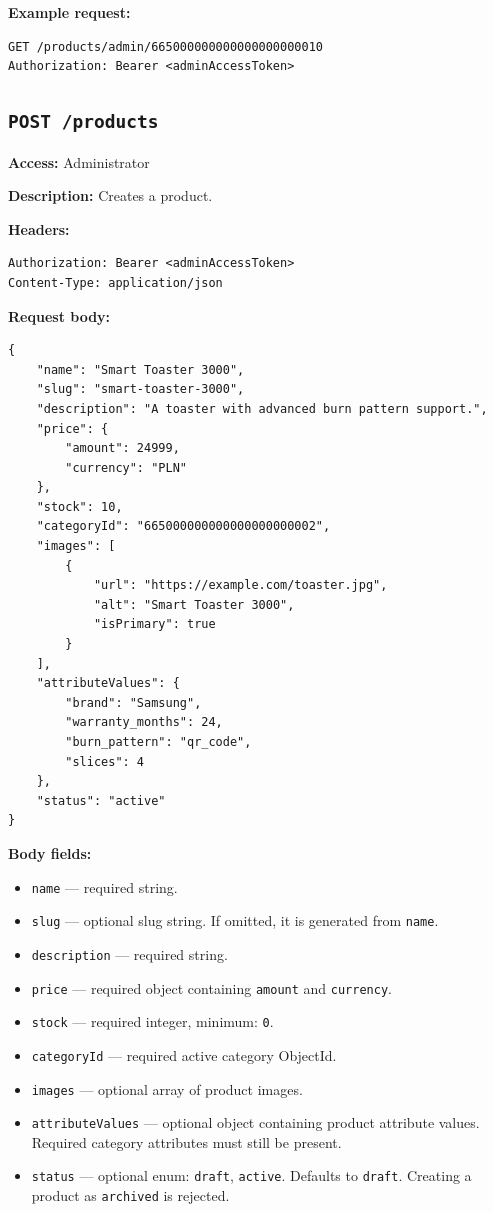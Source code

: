 \textbf{Example request:}

\begin{verbatim}
GET /products/admin/665000000000000000000010
Authorization: Bearer <adminAccessToken>
\end{verbatim}

\subsection{\texttt{POST /products}}

\textbf{Access:} Administrator

\textbf{Description:} Creates a product.

\textbf{Headers:}

\begin{verbatim}
Authorization: Bearer <adminAccessToken>
Content-Type: application/json
\end{verbatim}

\textbf{Request body:}

\begin{verbatim}
{
    "name": "Smart Toaster 3000",
    "slug": "smart-toaster-3000",
    "description": "A toaster with advanced burn pattern support.",
    "price": {
        "amount": 24999,
        "currency": "PLN"
    },
    "stock": 10,
    "categoryId": "665000000000000000000002",
    "images": [
        {
            "url": "https://example.com/toaster.jpg",
            "alt": "Smart Toaster 3000",
            "isPrimary": true
        }
    ],
    "attributeValues": {
        "brand": "Samsung",
        "warranty_months": 24,
        "burn_pattern": "qr_code",
        "slices": 4
    },
    "status": "active"
}
\end{verbatim}

\textbf{Body fields:}

\begin{itemize}
    \item \texttt{name} --- required string.
    \item \texttt{slug} --- optional slug string. If omitted, it is generated from \texttt{name}.
    \item \texttt{description} --- required string.
    \item \texttt{price} --- required object containing \texttt{amount} and \texttt{currency}.
    \item \texttt{stock} --- required integer, minimum: \texttt{0}.
    \item \texttt{categoryId} --- required active category ObjectId.
    \item \texttt{images} --- optional array of product images.
    \item \texttt{attributeValues} --- optional object containing product attribute values. Required category attributes must still be present.
    \item \texttt{status} --- optional enum: \texttt{draft}, \texttt{active}. Defaults to \texttt{draft}. Creating a product as \texttt{archived} is rejected.
\end{itemize}

